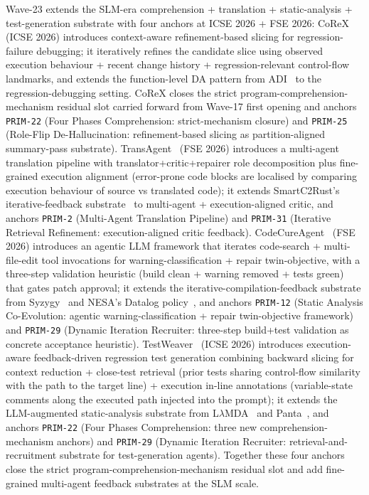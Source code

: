 Wave-23 extends the SLM-era comprehension + translation + static-analysis + test-generation substrate with four anchors at ICSE 2026 + FSE 2026: CoReX~\cite{p153_badihi_corex_2026} (ICSE 2026) introduces context-aware refinement-based slicing for regression-failure debugging; it iteratively refines the candidate slice using observed execution behaviour + recent change history + regression-relevant control-flow landmarks, and extends the function-level DA pattern from ADI~\cite{p133_xiang_adi_2026} to the regression-debugging setting. CoReX closes the strict program-comprehension-mechanism residual slot carried forward from Wave-17 first opening and anchors \texttt{PRIM-22} (Four Phases Comprehension: strict-mechanism closure) and \texttt{PRIM-25} (Role-Flip De-Hallucination: refinement-based slicing as partition-aligned summary-pass substrate). TransAgent~\cite{p154_yuan_transagent_2026} (FSE 2026) introduces a multi-agent translation pipeline with translator+critic+repairer role decomposition plus fine-grained execution alignment (error-prone code blocks are localised by comparing execution behaviour of source vs translated code); it extends SmartC2Rust's iterative-feedback substrate~\cite{p151_shiraishi_smartc2rust_2026} to multi-agent + execution-aligned critic, and anchors \texttt{PRIM-2} (Multi-Agent Translation Pipeline) and \texttt{PRIM-31} (Iterative Retrieval Refinement: execution-aligned critic feedback). CodeCureAgent~\cite{p155_joos_codecureagent_2026} (FSE 2026) introduces an agentic LLM framework that iterates code-search + multi-file-edit tool invocations for warning-classification + repair twin-objective, with a three-step validation heuristic (build clean + warning removed + tests green) that gates patch approval; it extends the iterative-compilation-feedback substrate from Syzygy~\cite{p124_shetty_syzygy_2025} and NESA's Datalog policy~\cite{p142_wang_nesa_2026}, and anchors \texttt{PRIM-12} (Static Analysis Co-Evolution: agentic warning-classification + repair twin-objective framework) and \texttt{PRIM-29} (Dynamic Iteration Recruiter: three-step build+test validation as concrete acceptance heuristic). TestWeaver~\cite{p156_le_testweaver_2026} (ICSE 2026) introduces execution-aware feedback-driven regression test generation combining backward slicing for context reduction + close-test retrieval (prior tests sharing control-flow similarity with the path to the target line) + execution in-line annotations (variable-state comments along the executed path injected into the prompt); it extends the LLM-augmented static-analysis substrate from L\(\lambda\)MDA~\cite{p129_rong_lamda_2026} and Panta~\cite{p140_gu_panta_2026}, and anchors \texttt{PRIM-22} (Four Phases Comprehension: three new comprehension-mechanism anchors) and \texttt{PRIM-29} (Dynamic Iteration Recruiter: retrieval-and-recruitment substrate for test-generation agents). Together these four anchors close the strict program-comprehension-mechanism residual slot and add fine-grained multi-agent feedback substrates at the SLM scale.

